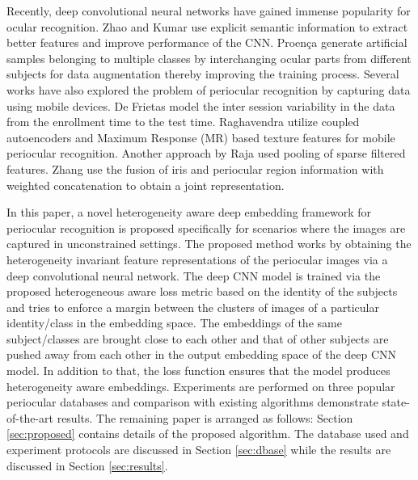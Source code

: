 \documentclass[10pt,twocolumn,letterpaper]{article}
\begin{document}
Recently, deep convolutional neural networks have gained immense popularity for ocular recognition. Zhao and Kumar \cite{zhao2017accurate} use explicit semantic information to extract better features and improve performance of the CNN. Proen\c ca \etal \cite{proencca2018deep}
generate artificial samples belonging to multiple classes by interchanging ocular parts from different subjects for data augmentation thereby improving the training process. Several works have also explored the problem of periocular recognition by capturing data using mobile devices. De Frietas \etal \cite{de2015periocular} model the inter session variability in the data from the enrollment time to the test time. %
Raghavendra \etal \cite{raghavendra2016learning} utilize coupled autoencoders and Maximum Response (MR) based texture features for mobile periocular recognition. Another approach by Raja \etal \cite{raja2016collaborative} used pooling of sparse filtered features. Zhang \etal \cite{zhang2018deep} use the fusion of iris and periocular region information with weighted concatenation to obtain a joint representation.


In this paper, a novel heterogeneity aware deep embedding framework for periocular recognition is proposed specifically for scenarios where the images are captured in unconstrained settings. The proposed method works by obtaining the heterogeneity invariant feature representations of the periocular images via a deep convolutional neural network. The deep CNN model is trained via the proposed heterogeneous aware loss metric based on the identity of the subjects and tries to enforce a margin between the clusters of images of a particular identity/class in the embedding space. The embeddings of the same subject/classes are brought close to each other and that of other subjects are pushed away from each other in the output embedding space of the deep CNN model. In addition to that, the loss function ensures that the model produces heterogeneity aware embeddings. Experiments are performed on three popular periocular databases and comparison with existing algorithms  demonstrate state-of-the-art results. The remaining paper is arranged as follows: Section \ref{sec:proposed} contains details of the proposed algorithm. The database used and experiment protocols are discussed in Section \ref{sec:dbase} while the results are discussed in Section \ref{sec:results}.   
\end{document}
